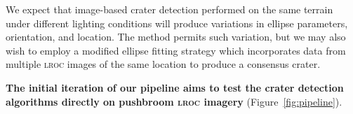 \documentclass[12pt]{olfmemo}
\begin{document}


We expect that image-based crater detection performed on the same terrain under different lighting conditions will produce variations in ellipse parameters, orientation, and location. The \citet{Christian2020} method permits such variation, but we may also wish to employ a modified ellipse fitting strategy which incorporates data from multiple \textsc{lroc} images of the same location to produce a consensus crater.

\textbf{The initial iteration of our pipeline aims to test the crater detection algorithms directly on pushbroom \textsc{lroc} imagery} (Figure~\ref{fig:pipeline}).

\end{document}
